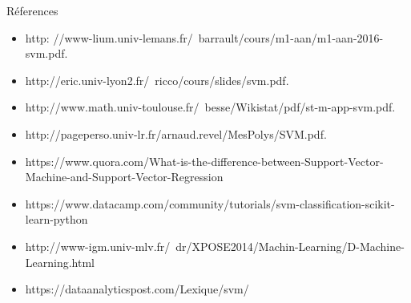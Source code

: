 \documentclass{bredelebeamer}
\begin{document}
 
  \begin{frame}{Réferences}
 \begin{itemize}   
  \item http: //www-lium.univ-lemans.fr/~barrault/cours/m1-aan/m1-aan-2016-svm.pdf.\vspace{1\baselineskip}\\
  \item http://eric.univ-lyon2.fr/~ricco/cours/slides/svm.pdf.\vspace{1\baselineskip}\\
  \item  http://www.math.univ-toulouse.fr/~besse/Wikistat/pdf/st-m-app-svm.pdf.\vspace{1\baselineskip}\\
   \item http://pageperso.univ-lr.fr/arnaud.revel/MesPolys/SVM.pdf.\vspace{1\baselineskip}\\
     \item https://www.quora.com/What-is-the-difference-between-Support-Vector-Machine-and-Support-Vector-Regression\vspace{1\baselineskip}\\
   \item https://www.datacamp.com/community/tutorials/svm-classification-scikit-learn-python\vspace{1\baselineskip}\\
      \item http://www-igm.univ-mlv.fr/~dr/XPOSE2014/Machin-Learning/D-Machine-Learning.html\vspace{1\baselineskip}\\
         \item https://dataanalyticspost.com/Lexique/svm/\vspace{1\baselineskip}\\

\end{itemize}
  \end{frame}
\end{document}
